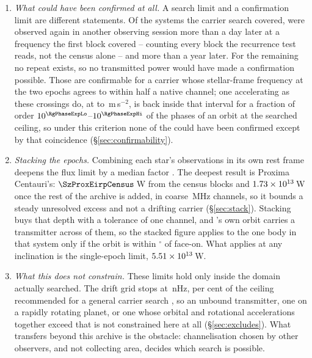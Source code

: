\begin{enumerate}[leftmargin=1.6em,itemsep=4pt,topsep=4pt,parsep=0pt]
\item \emph{What could have been confirmed at all.} A search limit and a
confirmation limit are different statements. Of the \NSysClassA{} systems the
carrier search covered, \ZcConfSysDay{} were observed again in another
observing session more than a day later at a frequency the first block
covered -- counting every
block the recurrence test reads, not the census alone -- and \ZcConfSysYr{}
more than a year later. For the remaining \ZcNoRepSys{} no repeat exists, so
no transmitted power would have made a confirmation possible. Those
\ZcConfSysDay{} are confirmable for a carrier whose stellar-frame frequency at
the two epochs agrees to within half a native channel; one accelerating as
these crossings do, at \ZtALosLo{} to \ZtALosHi\,m\,s$^{-2}$, is back inside
that interval for a fraction of order
$10^{\RgPhaseExpLo}$--$10^{\RgPhaseExpHi}$ of the phases of an orbit at the
searched ceiling, so under this criterion none of the \NSysClassA{} could have
been confirmed except by that coincidence (\S\ref{sec:confirmability}).

\item \emph{Stacking the epochs.} Combining each star's observations in its
own rest frame deepens the flux limit by a median factor \SyStkGainMed. The
deepest result is Proxima Centauri's: $\SzProxEirpCensus$\,W from the census
blocks and $1.73\times10^{13}$\,W once the rest of the archive is added, in
coarse \ChanBModeMHz\,MHz channels, so it bounds a steady unresolved excess
and not a drifting carrier (\S\ref{sec:stack}). Stacking buys that depth
with a tolerance of one channel, and \PxPlanet's own orbit carries a
transmitter across \PxNChanWalk{} of them, so the stacked figure applies to
the one body in that system only if the orbit is within
\PxIncMaxDeg$^\circ$ of face-on. What applies at any inclination is the
single-epoch limit, $5.51 \times 10^{13}$\,W.

\item \emph{What this does not constrain.} These limits hold only inside the
domain actually searched. The drift grid stops at \DriftCeilLo\,nHz,
\AccelSheikhPct{} per cent of the ceiling recommended for a general carrier
search \citep{Sheikh2019}, so an unbound transmitter, one on a rapidly
rotating planet, or one whose orbital and rotational accelerations together
exceed that is not constrained here at all (\S\ref{sec:excludes}). What
transfers beyond this archive is the obstacle: channelisation chosen by other
observers, and not collecting area, decides which search is possible.

\end{enumerate}
